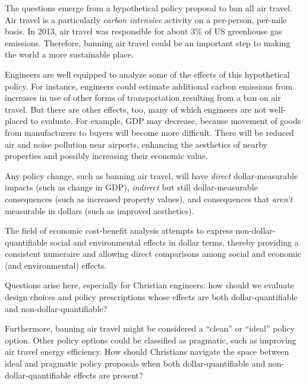 \documentclass[12pt]{article}
\begin{document}
The questions emerge from a hypothetical policy proposal to ban all air travel.
Air travel is a particularly \emph{carbon intensive} activity on a per-person, per-mile basis. 
In 2013, air travel was responsible for about 3\% of US greenhouse gas emissions. 
Therefore, banning air travel could be an important step to making the world a more sustainable place. 

Engineers are well equipped to analyze some of the effects of this hypothetical policy. 
For instance, engineers could estimate additional carbon emissions 
from increases in use of other forms of transportation resulting from 
a ban on air travel. 
But there are other effects, too, many of which engineers are not well-placed to evaluate.
For example, 
GDP may decrease, because movement of goods from 
manufacturers to buyers will become more difficult.
There will be reduced air and noise pollution near airports, 
enhancing the aesthetics of nearby properties
and possibly increasing their economic value. 

Any policy change, such as banning air travel, 
will have \emph{direct} dollar-measurable impacts (such as change in GDP), 
\emph{indirect} but still dollar-measurable consequences (such as increased property values), and
consequences that \emph{aren't} measurable in dollars 
(such as improved aesthetics). 

The field of economic cost-benefit analysis attempts to express non-dollar-quantifiable 
social and environmental effects in dollar terms, 
thereby providing a consistent numeraire and allowing direct comparisons 
among social and economic (and environmental) effects. 

Questions arise here, especially for Christian engineers:
how should we evaluate design choices and policy prescriptions
whose effects are both dollar-quantifiable and non-dollar-quantifiable?

Furthermore, banning air travel might be considered a ``clean'' or ``ideal'' policy option. 
Other policy options could be classified as pragmatic, 
such as improving air travel energy efficiency. 
How should Christians navigate the space between ideal and pragmatic policy proposals
when both dollar-quantifiable and non-dollar-quantifiable effects are present?
\end{document}

